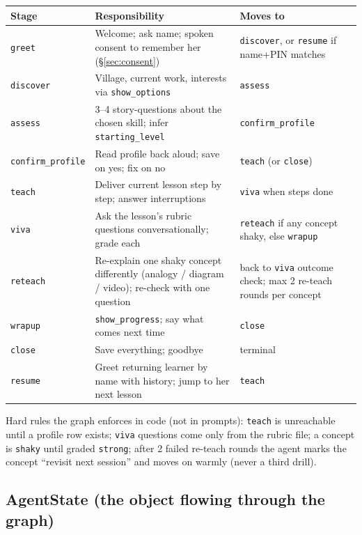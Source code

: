 \documentclass[11pt]{article}
\newcommand{\code}[1]{\texttt{#1}}
\begin{document}
\begin{center}
\begin{tabular}{p{2.2cm} p{6.6cm} p{4.6cm}}
\toprule
\textbf{Stage} & \textbf{Responsibility} & \textbf{Moves to} \\
\midrule
\code{greet} & Welcome; ask name; spoken consent to remember her (\S\ref{sec:consent}) & \code{discover}, or \code{resume} if name+PIN matches \\
\code{discover} & Village, current work, interests via \code{show\_options} & \code{assess} \\
\code{assess} & 3--4 story-questions about the chosen skill; infer \code{starting\_level} & \code{confirm\_profile} \\
\code{confirm\_profile} & Read profile back aloud; save on yes; fix on no & \code{teach} (or \code{close}) \\
\code{teach} & Deliver current lesson step by step; answer interruptions & \code{viva} when steps done \\
\code{viva} & Ask the lesson's rubric questions conversationally; grade each & \code{reteach} if any concept shaky, else \code{wrapup} \\
\code{reteach} & Re-explain one shaky concept differently (analogy / diagram / video); re-check with one question & back to \code{viva} outcome check; max 2 re-teach rounds per concept \\
\code{wrapup} & \code{show\_progress}; say what comes next time & \code{close} \\
\code{close} & Save everything; goodbye & terminal \\
\code{resume} & Greet returning learner by name with history; jump to her next lesson & \code{teach} \\
\bottomrule
\end{tabular}
\end{center}

Hard rules the graph enforces in code (not in prompts): \code{teach} is unreachable until a profile row exists; \code{viva} questions come only from the rubric file; a concept is \code{shaky} until graded \code{strong}; after 2 failed re-teach rounds the agent marks the concept ``revisit next session'' and moves on warmly (never a third drill).

\subsection{AgentState (the object flowing through the graph)}
\end{document}
